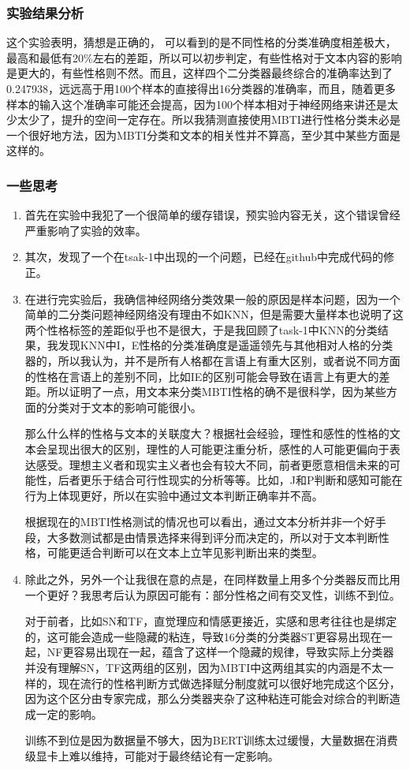 \documentclass{article}
\begin{document}
	\subsubsection{实验结果分析}
	这个实验表明，猜想是正确的， 可以看到的是不同性格的分类准确度相差极大，最高和最低有20\%左右的差距，所以可以初步判定，有些性格对于文本内容的影响是更大的，有些性格则不然。而且，这样四个二分类器最终综合的准确率达到了0.247938，远远高于用100个样本的直接得出16分类器的准确率，而且，随着更多样本的输入这个准确率可能还会提高，因为100个样本相对于神经网络来讲还是太少太少了，提升的空间一定存在。所以我猜测直接使用MBTI进行性格分类未必是一个很好地方法，因为MBTI分类和文本的相关性并不算高，至少其中某些方面是这样的。
	\subsubsection{一些思考}
	\begin{enumerate}
		\item 首先在实验中我犯了一个很简单的缓存错误，预实验内容无关，这个错误曾经严重影响了实验的效率。
		
		\item 其次，发现了一个在tsak-1中出现的一个问题，已经在github中完成代码的修正。
		
		\item 在进行完实验后，我确信神经网络分类效果一般的原因是样本问题，因为一个简单的二分类问题神经网络没有理由不如KNN，但是需要大量样本也说明了这两个性格标签的差距似乎也不是很大，于是我回顾了task-1中KNN的分类结果，我发现KNN中I，E性格的分类准确度是遥遥领先与其他相对人格的分类器的，所以我认为，并不是所有人格都在言语上有重大区别，或者说不同方面的性格在言语上的差别不同，比如IE的区别可能会导致在语言上有更大的差距。所以证明了一点，用文本来分类MBTI性格的确不是很科学，因为某些方面的分类对于文本的影响可能很小。
		
		那么什么样的性格与文本的关联度大？根据社会经验，理性和感性的性格的文本会呈现出很大的区别，理性的人可能更注重分析，感性的人可能更偏向于表达感受。理想主义者和现实主义者也会有较大不同，前者更愿意相信未来的可能性，后者更乐于结合可行性现实的分析等等。比如，J和P判断和感知可能在行为上体现更好，所以在实验中通过文本判断正确率并不高。
		
		根据现在的MBTI性格测试的情况也可以看出，通过文本分析并非一个好手段，大多数测试都是由情景选择来得到评分而决定的，所以对于文本判断性格，可能更适合判断可以在文本上立竿见影判断出来的类型。
		
		\item 除此之外，另外一个让我很在意的点是，在同样数量上用多个分类器反而比用一个更好？我思考后认为原因可能有：部分性格之间有交叉性，训练不到位。
		
		对于前者，比如SN和TF，直觉理应和情感更接近，实感和思考往往也是绑定的，这可能会造成一些隐藏的粘连，导致16分类的分类器ST更容易出现在一起，NF更容易出现在一起，蕴含了这样一个隐藏的规律，导致实际上分类器并没有理解SN，TF这两组的区别，因为MBTI中这两组其实的内涵是不太一样的，现在流行的性格判断方式做选择赋分制度就可以很好地完成这个区分，因为这个区分由专家完成，那么分类器夹杂了这种粘连可能会对综合的判断造成一定的影响。
		
		训练不到位是因为数据量不够大，因为BERT训练太过缓慢，大量数据在消费级显卡上难以维持，可能对于最终结论有一定影响。
	\end{enumerate}
\end{document}
